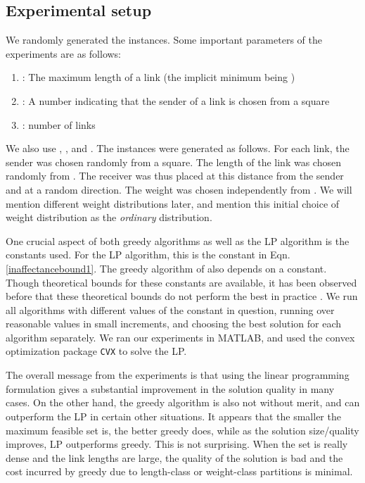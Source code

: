 \documentclass[11pt]{amsart}
\begin{document}
\subsection*{Experimental setup}
We randomly generated the instances. Some important parameters of the experiments are as follows:
\begin{enumerate}
\item : The maximum length of a link (the implicit minimum being )
\item : A number  indicating that the sender of a link is chosen
  from a  square
\item : number of links
\end{enumerate}
We also use , , and .
The instances were generated as follows. For each link, the sender was chosen randomly from a  square. The length of the link was chosen randomly from . The receiver was thus placed at this distance from the sender and at a random direction. The weight was chosen independently from . We will mention different weight distributions later, and mention this initial choice of weight distribution as the \emph{ordinary} distribution.

One crucial aspect of both greedy algorithms as well as the LP algorithm is the constants used. For the LP algorithm, this is the constant  in Eqn. \ref{inaffectancebound1}. The greedy algorithm of \cite{SODA11} also depends on a constant.
Though theoretical bounds for these constants are available, it has been observed before that these theoretical
bounds do not perform the best in practice \cite{infocom11}. We run all algorithms with different values of the constant in question, running over reasonable values in small increments, and choosing the best solution for each algorithm separately.
We ran our experiments in MATLAB, and used the convex optimization package  \texttt{CVX} \cite{cvx} to solve the LP.

The overall message from the experiments is that using the linear
programming formulation gives a substantial improvement in the
solution quality in many cases. 
On the other hand, the greedy algorithm is also not without merit, and can outperform the LP in certain other situations.
It appears that the smaller the maximum feasible set is, the better
greedy does, while as the solution size/quality improves, LP
outperforms greedy. This is not surprising. When the set is really
dense and the link lengths are large, the quality of the solution is
bad and the cost incurred by greedy due to length-class or
weight-class partitions is minimal. 
\end{document}
